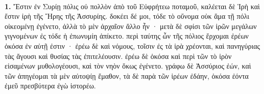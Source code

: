 \documentclass[a4paper, 11pt, oneside, polutonikogreek, german]{article}
\begin{document}
\paragraph{}
\textbf{1.} Ἔστιν ἐν Συρίῃ πόλις οὐ πολλὸν ἀπὸ τοῦ Εὐφρήτεω ποταμοῦ, καλέεται δὲ Ἱρὴ καὶ ἔστιν ἱρὴ τῆς Ἥρης τῆς Ἀσσυρίης. δοκέει δέ μοι, τόδε τὸ οὔνομα οὐκ ἅμα τῇ πόλι οἰκεομένῃ ἐγένετο, ἀλλὰ τὸ μὲν ἀρχαῖον ἄλλο ἦν · μετὰ δὲ σφίσι τῶν ἱρῶν μεγάλων γιγνομένων ἐς τόδε ἡ ἐπωνυμίη ἀπίκετο. περὶ ταύτης ὦν τῆς πόλιος ἔρχομαι ἐρέων ὁκόσα ἐν αὐτῇ ἐστιν · ἐρέω δὲ καὶ νόμους, τοῖσιν ἐς τὰ ἱρὰ χρέονται, καὶ πανηγύριας τὰς ἄγουσι καὶ θυσίας τὰς ἐπιτελέουσιν. ἐρέω δὲ ὁκόσα καὶ περὶ τῶν τὸ ἱρὸν εἱσαμένων μυθολογέουσι, καὶ τὸν νηὸν ὅκως ἐγένετο. γράφω δὲ Ἀσσύριος ἐών, καὶ τῶν ἀπηγέομαι τὰ μὲν αὐτοψίῃ ἔμαθον, τὰ δὲ παρὰ τῶν ἱρέων ἐδάην, ὁκόσα ἐόντα ἐμεῦ πρεσβύτερα ἐγὼ ἱστορέω.
\end{document}
